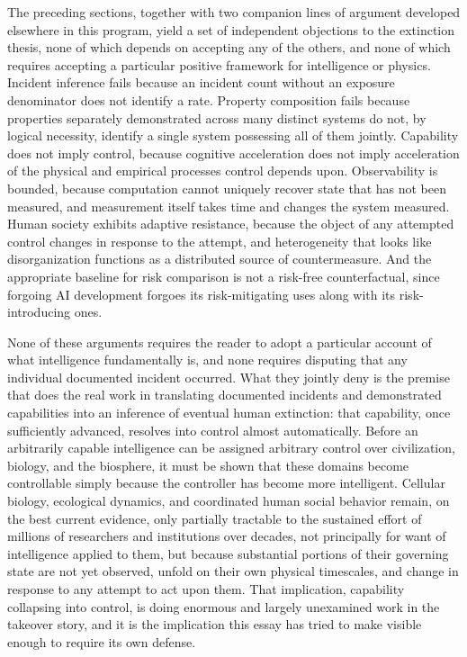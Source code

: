 \documentclass[11pt]{article}
\begin{document}
The preceding sections, together with two companion lines of argument developed elsewhere in this program, yield a set of independent objections to the extinction thesis, none of which depends on accepting any of the others, and none of which requires accepting a particular positive framework for intelligence or physics. Incident inference fails because an incident count without an exposure denominator does not identify a rate. Property composition fails because properties separately demonstrated across many distinct systems do not, by logical necessity, identify a single system possessing all of them jointly. Capability does not imply control, because cognitive acceleration does not imply acceleration of the physical and empirical processes control depends upon. Observability is bounded, because computation cannot uniquely recover state that has not been measured, and measurement itself takes time and changes the system measured. Human society exhibits adaptive resistance, because the object of any attempted control changes in response to the attempt, and heterogeneity that looks like disorganization functions as a distributed source of countermeasure. And the appropriate baseline for risk comparison is not a risk-free counterfactual, since forgoing AI development forgoes its risk-mitigating uses along with its risk-introducing ones.

None of these arguments requires the reader to adopt a particular account of what intelligence fundamentally is, and none requires disputing that any individual documented incident occurred. What they jointly deny is the premise that does the real work in translating documented incidents and demonstrated capabilities into an inference of eventual human extinction: that capability, once sufficiently advanced, resolves into control almost automatically. Before an arbitrarily capable intelligence can be assigned arbitrary control over civilization, biology, and the biosphere, it must be shown that these domains become controllable simply because the controller has become more intelligent. Cellular biology, ecological dynamics, and coordinated human social behavior remain, on the best current evidence, only partially tractable to the sustained effort of millions of researchers and institutions over decades, not principally for want of intelligence applied to them, but because substantial portions of their governing state are not yet observed, unfold on their own physical timescales, and change in response to any attempt to act upon them. That implication, capability collapsing into control, is doing enormous and largely unexamined work in the takeover story, and it is the implication this essay has tried to make visible enough to require its own defense.
\end{document}
